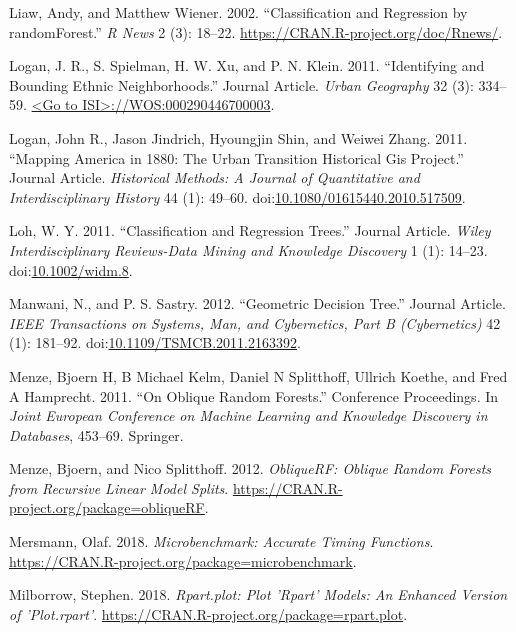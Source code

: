 \documentclass[]{elsarticle} %
\begin{document}
\hypertarget{ref-Liaw2002}{}
Liaw, Andy, and Matthew Wiener. 2002. ``Classification and Regression by
randomForest.'' \emph{R News} 2 (3): 18--22.
\url{https://CRAN.R-project.org/doc/Rnews/}.

\hypertarget{ref-Logan2011}{}
Logan, J. R., S. Spielman, H. W. Xu, and P. N. Klein. 2011.
``Identifying and Bounding Ethnic Neighborhoods.'' Journal Article.
\emph{Urban Geography} 32 (3): 334--59.
\href{\%3CGo\%20to\%20ISI\%3E://WOS:000290446700003}{\textless{}Go to ISI\textgreater{}://WOS:000290446700003}.

\hypertarget{ref-Logan2011urbanhistorical}{}
Logan, John R., Jason Jindrich, Hyoungjin Shin, and Weiwei Zhang. 2011.
``Mapping America in 1880: The Urban Transition Historical Gis
Project.'' Journal Article. \emph{Historical Methods: A Journal of
Quantitative and Interdisciplinary History} 44 (1): 49--60.
doi:\href{https://doi.org/10.1080/01615440.2010.517509}{10.1080/01615440.2010.517509}.

\hypertarget{ref-Loh2011}{}
Loh, W. Y. 2011. ``Classification and Regression Trees.'' Journal
Article. \emph{Wiley Interdisciplinary Reviews-Data Mining and Knowledge
Discovery} 1 (1): 14--23.
doi:\href{https://doi.org/10.1002/widm.8}{10.1002/widm.8}.

\hypertarget{ref-Manwani2012}{}
Manwani, N., and P. S. Sastry. 2012. ``Geometric Decision Tree.''
Journal Article. \emph{IEEE Transactions on Systems, Man, and
Cybernetics, Part B (Cybernetics)} 42 (1): 181--92.
doi:\href{https://doi.org/10.1109/TSMCB.2011.2163392}{10.1109/TSMCB.2011.2163392}.

\hypertarget{ref-Menze2011}{}
Menze, Bjoern H, B Michael Kelm, Daniel N Splitthoff, Ullrich Koethe,
and Fred A Hamprecht. 2011. ``On Oblique Random Forests.'' Conference
Proceedings. In \emph{Joint European Conference on Machine Learning and
Knowledge Discovery in Databases}, 453--69. Springer.

\hypertarget{ref-Menze2012}{}
Menze, Bjoern, and Nico Splitthoff. 2012. \emph{ObliqueRF: Oblique
Random Forests from Recursive Linear Model Splits}.
\url{https://CRAN.R-project.org/package=obliqueRF}.

\hypertarget{ref-Mersmann2018}{}
Mersmann, Olaf. 2018. \emph{Microbenchmark: Accurate Timing Functions}.
\url{https://CRAN.R-project.org/package=microbenchmark}.

\hypertarget{ref-Milborrow2018}{}
Milborrow, Stephen. 2018. \emph{Rpart.plot: Plot 'Rpart' Models: An
Enhanced Version of 'Plot.rpart'}.
\url{https://CRAN.R-project.org/package=rpart.plot}.
\end{document}

